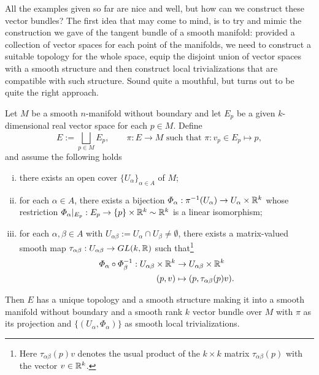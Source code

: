 All the examples given so far are nice and well, but how can we construct these vector bundles?
The first idea that may come to mind, is to  try and mimic the construction we gave of the tangent bundle of a smooth manifold: provided a collection of vector spaces for each point of the manifolds, we need to construct a suitable topology for the whole space, equip the disjoint union of vector spaces with a smooth structure and then construct local trivializations that are compatible with such structure.
Sound quite a mouthful, but turns out to be quite the right approach.

\begin{theorem}\label{thm:bundle_chart_thm}
	Let $M$ be a smooth $n$-manifold without boundary and let $E_p$ be a given $k$-dimensional real vector space for each $p\in M$.
	Define
	\begin{equation}
		E := \bigsqcup_{p\in M} E_p, \qquad
		\pi : E\to M \mbox{ such that } \pi : v_p \in E_p \mapsto p,
	\end{equation}
	and assume the following holds
	\begin{enumerate}[(i)]
		\item there exists an open cover $\{U_\alpha\}_{\alpha\in A}$ of $M$;
		\item for each $\alpha\in A$, there exists a bijection $\varPhi_\alpha: \pi^{-1}(U_\alpha) \to U_\alpha\times\mathbb{R}^k$ whose restriction $\varPhi_\alpha|_{E_p} : E_p \to \{p\}\times\mathbb{R}^k \sim \mathbb{R}^k$ is a linear isomorphism;
		\item for each $\alpha,\beta \in A$ with $U_{\alpha\beta}:=U_\alpha \cap U_\beta \neq \emptyset$, there exists a matrix-valued smooth map $\tau_{\alpha\beta}: U_{\alpha\beta} \to GL(k,\mathbb{R})$ such that\footnote{Here $\tau_{\alpha\beta}(p) v$ denotes the usual product of the $k\times k$ matrix $\tau_{\alpha\beta}(p)$ with the vector $v\in\mathbb{R}^k$.}
		      \begin{align}
			      \varPhi_\alpha \circ \varPhi_\beta^{-1} : U_{\alpha\beta}\times\mathbb{R}^k & \to U_{\alpha\beta}\times\mathbb{R}^k         \\
			      (p, v)                                                              & \mapsto (p, \tau_{\alpha\beta}(p) v).
		      \end{align}
	\end{enumerate}
	Then $E$ has a unique topology and a smooth structure making it into a smooth manifold without boundary and a smooth rank $k$ vector bundle over $M$ with $\pi$ as its projection and $\{(U_\alpha, \varPhi_\alpha)\}$ as smooth local trivializations.
\end{theorem}
